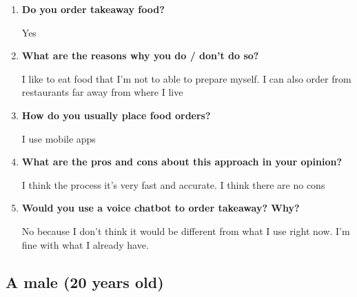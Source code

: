 \begin{enumerate}

\item \textbf{Do you order takeaway food?}

Yes

\item \textbf{What are the reasons why you do / don't do so?}

I like to eat food that I'm not to able to prepare myself. I can also order from restaurants far away from where I live

\item \textbf{How do you usually place food orders?}

I use mobile apps

\item \textbf{What are the pros and cons about this approach in your opinion?}

I think the process it's very fast and accurate. I think there are no cons

\item \textbf{Would you use a voice chatbot to order takeaway? Why?}

No because I don't think it would be different from what I use right now. I'm fine with what I already have.

\end{enumerate}


\subsection*{A male (20 years old)}

